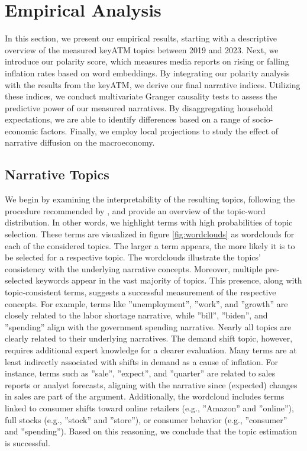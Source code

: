 \section{Empirical Analysis}\label{sec:Analysis}

 In this section, we present our empirical results, starting with a descriptive overview of the measured \textsf{keyATM} topics between 2019 and 2023. Next, we introduce our polarity score, which measures media reports on rising or falling inflation rates based on word embeddings. By integrating our polarity analysis with the results from the \textsf{keyATM}, we derive our final narrative indices. Utilizing these indices, we conduct multivariate Granger causality tests to assess the predictive power of our measured narratives. By disaggregating household expectations, we are able to identify differences based on a range of socio-economic factors. Finally, we employ local projections to study the effect of narrative diffusion on the macroeconomy.

\subsection{Narrative Topics}\label{subsec:atmtopics}

We begin by examining the interpretability of the resulting topics, following the procedure recommended by \citet{Eshima.2023}, and provide an overview of the topic-word distribution. In other words, we highlight terms with high probabilities of topic selection. These terms are visualized in figure \ref{fig:wordclouds} as wordclouds for each of the considered topics. The larger a term appears, the more likely it is to be selected for a respective topic. The wordclouds illustrate the topics' consistency with the underlying narrative concepts. Moreover, multiple pre-selected keywords appear in the vast majority of topics. This presence, along with topic-consistent terms, suggests a successful measurement of the respective concepts. For example, terms like ''unemployment'', ''work'', and ''growth'' are closely related to the labor shortage narrative, while ''bill'', ''biden'', and ''spending'' align with the government spending narrative. Nearly all topics are clearly related to their underlying narratives. The demand shift topic, however, requires additional expert knowledge for a clearer evaluation. Many terms are at least indirectly associated with shifts in demand as a cause of inflation. For instance, terms such as ''sale'', ''expect'', and ''quarter'' are related to sales reports or analyst forecasts, aligning with the narrative since (expected) changes in sales are part of the argument. Additionally, the wordcloud includes terms linked to consumer shifts toward online retailers (e.g., ''Amazon'' and ''online''), full stocks (e.g., ''stock'' and ''store''), or consumer behavior (e.g., ''consumer'' and ''spending''). Based on this reasoning, we conclude that the topic estimation is successful.

